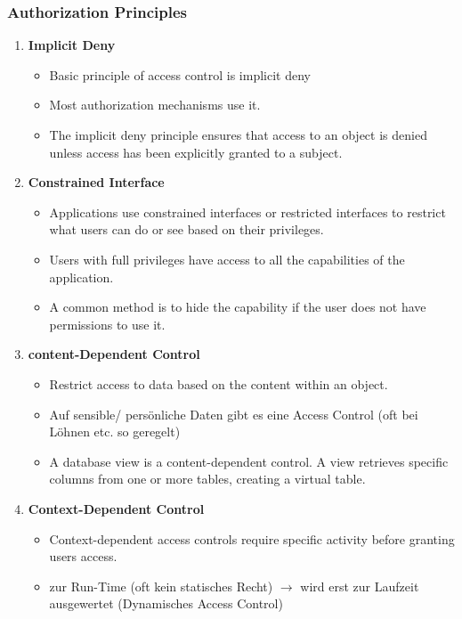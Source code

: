 \newpage

\subsubsection{Authorization Principles}
\begin{enumerate}
    \item \textbf{Implicit Deny}
    \begin{itemize}
        \item Basic principle of access control is implicit deny
        \item Most authorization mechanisms use it.
        \item The implicit deny principle ensures that access to an object is denied unless access has been explicitly granted to a subject.
    \end{itemize}
    \item \textbf{Constrained Interface}
    \begin{itemize}
        \item Applications use constrained interfaces or restricted interfaces to restrict what users can do or see based on their privileges.
        \item Users with full privileges have access to all the capabilities of the application.
        \item A common method is to hide the capability if the user does not have permissions to use it.
    \end{itemize}
    \item \textbf{content-Dependent Control}
    \begin{itemize}
        \item Restrict access to data based on the content within an object.
        \item Auf sensible/ persönliche Daten gibt es eine Access Control (oft bei Löhnen etc. so geregelt)
        \item A database view is a content-dependent control. A view retrieves specific columns from one or more tables, creating a virtual table.
    \end{itemize}
    \item \textbf{Context-Dependent Control}
    \begin{itemize}
        \item Context-dependent access controls require specific activity before granting users access.
        \item zur Run-Time (oft kein statisches Recht) $\rightarrow$ wird erst zur Laufzeit ausgewertet (Dynamisches Access Control)

\end{itemize}
\end{enumerate}
